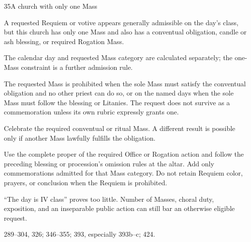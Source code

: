 \begin{casefile}{35}{A church with only one Mass}
\item[Calendar facts] A requested Requiem or votive appears generally admissible on the day's class, but this church has only one Mass and also has a conventual obligation, candle or ash blessing, or required Rogation Mass.
\item[Ranks and rows] The calendar day and requested Mass category are calculated separately; the one-Mass constraint is a further admission rule.
\item[Impeded item] The requested Mass is prohibited when the sole Mass must satisfy the conventual obligation and no other priest can do so, or on the named days when the sole Mass must follow the blessing or Litanies.  The request does not survive as a commemoration unless its own rubric expressly grants one.
\item[Mass category] Celebrate the required conventual or ritual Mass.  A different result is possible only if another Mass lawfully fulfills the obligation.
\item[Assembly] Use the complete proper of the required Office or Rogation action and follow the preceding blessing or procession's omission rules at the altar.  Add only commemorations admitted for that Mass category.  Do not retain Requiem color, prayers, or conclusion when the Requiem is prohibited.
\item[Boundary] “The day is IV class” proves too little.  Number of Masses, choral duty, exposition, and an inseparable public action can still bar an otherwise eligible request.
\item[Rubric locus] 289--304, 326; 346--355; 393, especially 393b--c; 424.
\end{casefile}
